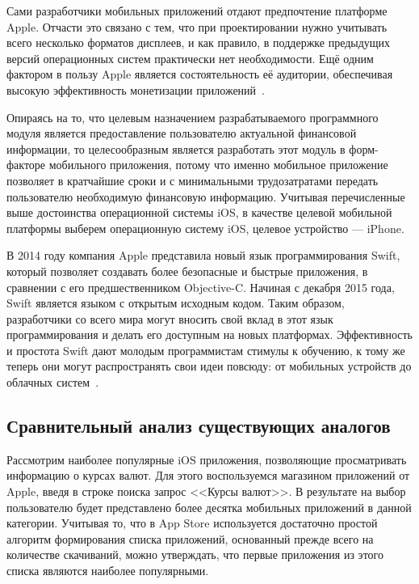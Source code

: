 Сами разработчики мобильных приложений отдают предпочтение платформе Apple.
Отчасти это связано с тем, что при проектировании нужно учитывать всего
несколько форматов дисплеев, и как правило, в поддержке предыдущих
версий операционных систем практически нет необходимости.
Ещё одним фактором в пользу Apple является состоятельность её аудитории,
обеспечивая высокую эффективность монетизации приложений~\cite{ios_android_compare}.



Опираясь на то, что целевым назначением разрабатываемого программного модуля
является предоставление пользователю актуальной финансовой информации,
то целесообразным является разработать этот модуль в форм-факторе мобильного
приложения, потому что именно мобильное приложение позволяет в кратчайшие сроки
и с минимальными трудозатратами передать пользователю необходимую финансовую
информацию.
Учитывая перечисленные выше достоинства операционной системы iOS, в качестве
целевой мобильной платформы выберем операционную систему iOS,
целевое устройство --- iPhone.

В 2014 году компания Apple представила новый язык программирования Swift,
который позволяет создавать более безопасные и быстрые приложения, в сравнении
с его предшественником Objective-C.
Начиная с декабря 2015 года, Swift является языком с открытым исходным кодом.
Таким образом, разработчики со всего мира могут вносить свой вклад
в этот язык программирования и делать его доступным на новых платформах.
Эффективность и простота Swift дают молодым программистам стимулы к обучению,
к тому же теперь они могут распространять свои идеи повсюду:
от мобильных устройств до облачных систем~\cite{swift_becomes_open_source}.



\subsection{Сравнительный анализ существующих аналогов}

Рассмотрим наиболее популярные iOS приложения, позволяющие просматривать
информацию о курсах валют. Для этого воспользуемся магазином приложений от Apple,
введя в строке поиска запрос <<Курсы валют>>. В результате на выбор
пользователю будет представлено более десятка мобильных приложений в данной
категории. Учитывая то, что в App Store используется достаточно
простой алгоритм формирования списка приложений, основанный прежде всего на
количестве скачиваний, можно утверждать, что первые приложения из этого списка
являются наиболее популярными.

